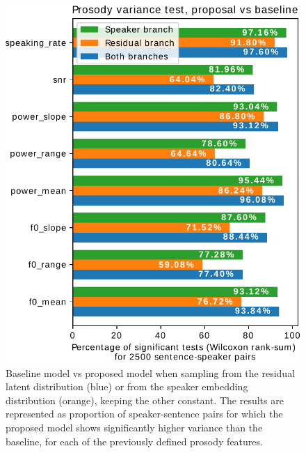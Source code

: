 \begin{figure}[h!]
	\centering
	\includegraphics[width=0.7\linewidth]{tts/images/wilcoxon}
	\caption{Baseline model vs proposed model when sampling from the residual latent distribution (blue) or from the speaker embedding distribution (orange), keeping the other constant. The results are represented as proportion of speaker-sentence pairs for which the proposed model shows significantly higher variance than the baseline, for each of the previously defined prosody features.}
	\label{fig:wilcoxon}
\end{figure}


